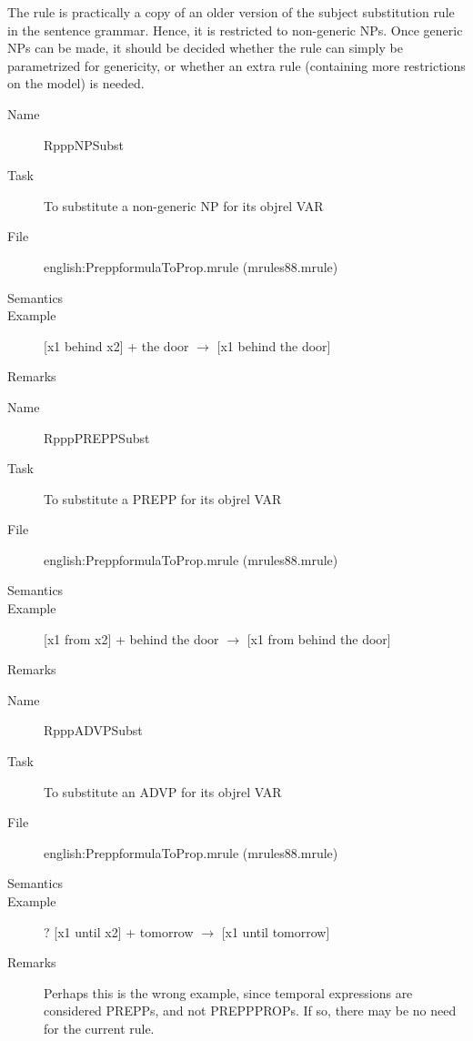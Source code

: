 \begin{description}
\begin{description}
The rule is practically a copy of an older version of the subject substitution 
rule in the 
sentence grammar. Hence, it is restricted to non-generic NPs. Once generic NPs 
can be made, it should be decided whether the rule can simply be parametrized 
for genericity, or whether an extra rule (containing more restrictions on the 
model) is needed. 
\end{description}

\vspace{1 cm}
\begin{description}
\item[Name] RpppNPSubst
\item[Task] To substitute a non-generic NP for its objrel VAR
\item[File] english:PreppformulaToProp.mrule (mrules88.mrule)
\item[Semantics]
\item[Example] [x1 behind x2] + the door $\rightarrow$ [x1 behind the door]
\item[Remarks]
\end{description}

\vspace{1 cm}
\begin{description}
\item[Name] RpppPREPPSubst
\item[Task] To substitute a PREPP for its objrel VAR
\item[File] english:PreppformulaToProp.mrule (mrules88.mrule)
\item[Semantics]
\item[Example] [x1 from x2] + behind the door $\rightarrow$ [x1 from behind 
the door]
\item[Remarks]
\end{description}

\vspace{1 cm}
\begin{description}
\item[Name] RpppADVPSubst
\item[Task] To substitute an ADVP for its objrel VAR
\item[File] english:PreppformulaToProp.mrule (mrules88.mrule)
\item[Semantics]
\item[Example] ? [x1 until x2] + tomorrow $\rightarrow$ [x1 until tomorrow]
\item[Remarks] Perhaps this is the wrong example, since temporal expressions 
are considered PREPPs, and not PREPPPROPs. If so, there may be no need for the 
current rule.
\end{description}

\end{description}


